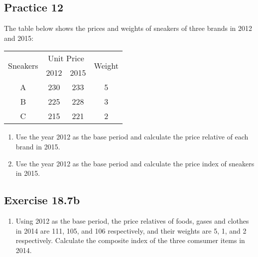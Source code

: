 \documentclass{report}
\begin{document}
\begin{multicols}{2}
  \subsection*{Practice 12}

  The table below shows the prices and weights of sneakers of three brands in
  2012 and 2015:
  \begin{center}
    \begin{tabular}{|c|c|c|c|}
      \hline
      \multirow{2}{*}{Sneakers} & \multicolumn{2}{c|}{Unit Price} & \multirow{2}{*}{Weight}     \\
      \cline{2-3}
                                & 2012                            & 2015                    &   \\
      \hline
      A                         & 230                             & 233                     & 5 \\
      B                         & 225                             & 228                     & 3 \\
      C                         & 215                             & 221                     & 2 \\
      \hline
    \end{tabular}
  \end{center}
  \begin{enumerate}
    \item Use the year 2012 as the base period and calculate the price relative of each
          brand in 2015.
    \item Use the year 2012 as the base period and calculate the price index of sneakers
          in 2015.
  \end{enumerate}

  \subsection*{Exercise 18.7b}

  \begin{enumerate}
    \item Using 2012 as the base period, the price relatives of foods, gases and clothes
          in 2014 are 111, 105, and 106 respectively, and their weights are 5, 1, and 2
          respectively. Calculate the composite index of the three comsumer items in
          2014.


\end{enumerate}
\end{multicols}
\end{document}
